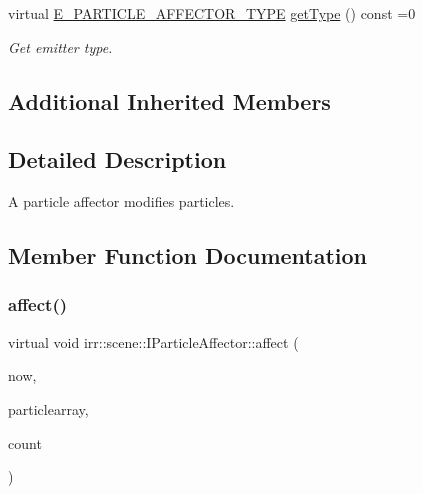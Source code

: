 \begin{DoxyCompactItemize}
\mbox{\label{classirr_1_1scene_1_1IParticleAffector_add5652cd7dabb91342497fed776e2557}} 
virtual \hyperlink{namespaceirr_1_1scene_a34c0f9475cfcbda8b50ad816a046010b}{E\+\_\+\+P\+A\+R\+T\+I\+C\+L\+E\+\_\+\+A\+F\+F\+E\+C\+T\+O\+R\+\_\+\+T\+Y\+PE} \hyperlink{classirr_1_1scene_1_1IParticleAffector_add5652cd7dabb91342497fed776e2557}{get\+Type} () const =0
\begin{DoxyCompactList}\small\item\em Get emitter type. \end{DoxyCompactList}\end{DoxyCompactItemize}
\subsection*{Additional Inherited Members}


\subsection{Detailed Description}
A particle affector modifies particles. 

\subsection{Member Function Documentation}
\mbox{\label{classirr_1_1scene_1_1IParticleAffector_a87fb9116bb1a4d3ea075c59f3e2d1dbc}} 
\subsubsection{\texorpdfstring{affect()}{affect()}\hspace{0.1cm}{\footnotesize\ttfamily [1/2]}}
{\footnotesize\ttfamily virtual void irr\+::scene\+::\+I\+Particle\+Affector\+::affect (\begin{DoxyParamCaption}\item[{\hyperlink{namespaceirr_a0416a53257075833e7002efd0a18e804}{u32}}]{now,  }\item[{\hyperlink{structirr_1_1scene_1_1SParticle}{S\+Particle} $\ast$}]{particlearray,  }\item[{\hyperlink{namespaceirr_a0416a53257075833e7002efd0a18e804}{u32}}]{count }\end{DoxyParamCaption})\hspace{0.3cm}{\ttfamily [pure virtual]}}




